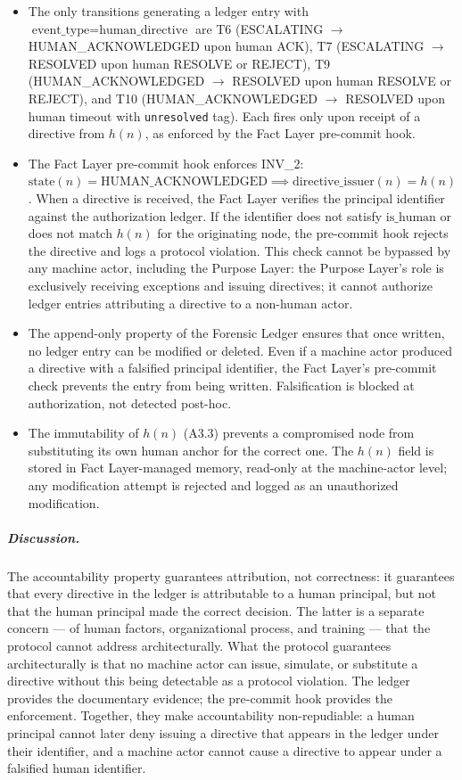 \begin{itemize}
\item[Step 1.] The only transitions generating a ledger entry with $\text{event\_type} = \text{human\_directive}$ are T6 (ESCALATING $\rightarrow$ HUMAN\_ACKNOWLEDGED upon human ACK), T7 (ESCALATING $\rightarrow$ RESOLVED upon human RESOLVE or REJECT), T9 (HUMAN\_ACKNOWLEDGED $\rightarrow$ RESOLVED upon human RESOLVE or REJECT), and T10 (HUMAN\_ACKNOWLEDGED $\rightarrow$ RESOLVED upon human timeout with \texttt{unresolved} tag). Each fires only upon receipt of a directive from $h(n)$, as enforced by the Fact Layer pre-commit hook.

\item[Step 2.] The Fact Layer pre-commit hook enforces INV\_2: $\text{state}(n) = \text{HUMAN\_ACKNOWLEDGED} \implies \text{directive\_issuer}(n) = h(n)$. When a directive is received, the Fact Layer verifies the principal identifier against the authorization ledger. If the identifier does not satisfy $\text{is\_human}$ or does not match $h(n)$ for the originating node, the pre-commit hook rejects the directive and logs a protocol violation. This check cannot be bypassed by any machine actor, including the Purpose Layer: the Purpose Layer's role is exclusively receiving exceptions and issuing directives; it cannot authorize ledger entries attributing a directive to a non-human actor.

\item[Step 3.] The append-only property of the Forensic Ledger ensures that once written, no ledger entry can be modified or deleted. Even if a machine actor produced a directive with a falsified principal identifier, the Fact Layer's pre-commit check prevents the entry from being written. Falsification is blocked at authorization, not detected post-hoc.

\item[Step 4.] The immutability of $h(n)$ (A3.3) prevents a compromised node from substituting its own human anchor for the correct one. The $h(n)$ field is stored in Fact Layer-managed memory, read-only at the machine-actor level; any modification attempt is rejected and logged as an unauthorized modification.
\end{itemize}

\subparagraph{Discussion.} The accountability property guarantees attribution, not correctness: it guarantees that every directive in the ledger is attributable to a human principal, but not that the human principal made the correct decision. The latter is a separate concern — of human factors, organizational process, and training — that the protocol cannot address architecturally. What the protocol guarantees architecturally is that no machine actor can issue, simulate, or substitute a directive without this being detectable as a protocol violation. The ledger provides the documentary evidence; the pre-commit hook provides the enforcement. Together, they make accountability non-repudiable: a human principal cannot later deny issuing a directive that appears in the ledger under their identifier, and a machine actor cannot cause a directive to appear under a falsified human identifier.

